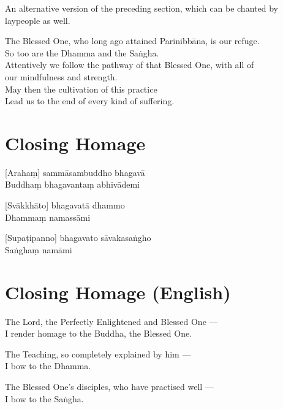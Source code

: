 \begin{instruction}
  An alternative version of the preceding section, which can be chanted by laypeople as well.
\end{instruction}

The Blessed One, who long ago attained Parinibbāna, is our refuge.\\
So too are the Dhamma and the Saṅgha.\\
Attentively we follow the pathway of that Blessed One, with all of \\our mindfulness and strength.\\
May then the cultivation of this practice\\
Lead us to the end of every kind of suffering.

\section*{Closing Homage}

[Arahaṃ] sammāsambuddho bhagavā\\
Buddhaṃ bhagavantaṃ abhivādemi

[Svākkhāto] bhagavatā dhammo\\
Dhammaṃ namassāmi

[Supaṭipanno] bhagavato sāvakasaṅgho\\
Saṅghaṃ namāmi

\section*{Closing Homage (English)}

The Lord, the Perfectly Enlightened and Blessed One ---\\
I render homage to the Buddha, the Blessed One.

The Teaching, so completely explained by him ---\\
I bow to the Dhamma.

The Blessed One's disciples, who have practised well ---\\
I bow to the Saṅgha.

